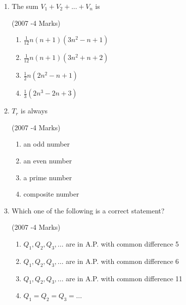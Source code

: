 \documentclass[journal,12pt,twocolumn]{IEEEtran}
\theoremstyle{remark}
\begin{document}
 \begin{enumerate}

 \item The sum  $  V_{1}+V_{2}+...+V_{n} $  is 
 
	                            \hfill(2007 -4 Marks)                             
     \begin{enumerate}
         
	\item $\frac{1}{12}n(n+1)(3n^{2}-n+1)$
	\item $\frac{1}{12}n(n+1)(3n^2{}+n+2)$
	\item $\frac{1}{2}n(2n^{2}-n+1)$
	\item $\frac{1}{3}(2n^{3}-2n+3)$
    \end{enumerate} 

  \item $T_{r}$ is always 
                           
                                \hfill(2007 -4 Marks)                     
                  \begin{multicols}{2}      
                        \begin{enumerate} 
	
       \item an odd number 
       \item an even number
	\item a prime number 
        \item composite number

	  \end{enumerate}
   \end{multicols}
    \item Which one of the following is a correct statement? 
          
           \hfill(2007 -4 Marks)                                  
     \begin{enumerate}
	\item $Q_{1},Q_{2},Q_{3},...$ are in A.P. with common difference 5 
	\item $Q_{1},Q_{2},Q_{3},...$ are in A.P. with common difference 6
	\item $Q_{1},Q_{2},Q_{3},...$ are in A.P. with common difference 11
	\item $Q_{1}=Q_{2}=Q_{3}=...$
     \end{enumerate}



 \end{enumerate}

	






    
\end{document}
